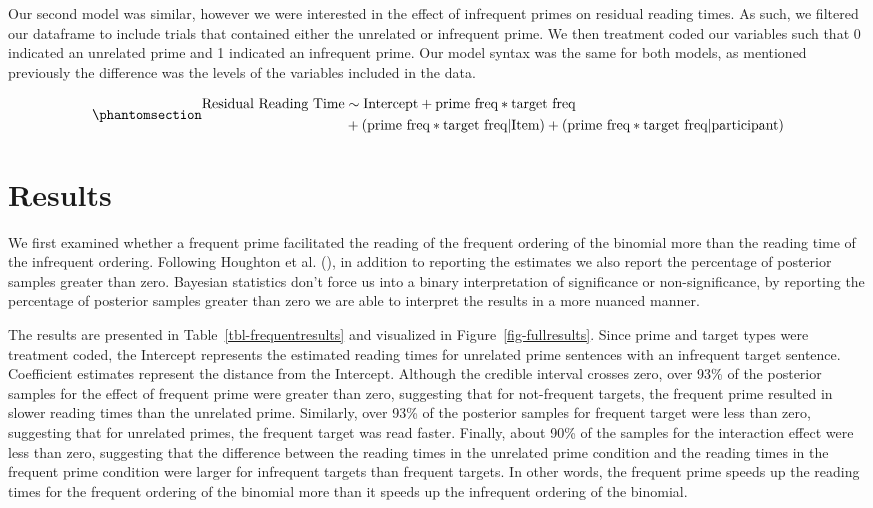 \documentclass[
  12pt,
]{scrartcl}
\begin{document}
Our second model was similar, however we were interested in the effect
of infrequent primes on residual reading times. As such, we filtered our
dataframe to include trials that contained either the unrelated or
infrequent prime. We then treatment coded our variables such that 0
indicated an unrelated prime and 1 indicated an infrequent prime. Our
model syntax was the same for both models, as mentioned previously the
difference was the levels of the variables included in the data.

\begin{equation}\phantomsection\label{eq-models}{
\begin{aligned}
\text{Residual Reading Time} & \sim \text{Intercept} + \text{prime freq} * \text{target freq} \\ 
&+ (\text{prime freq} * \text{target freq} | \text{Item}) + (\text{prime freq} * \text{target freq} | \text{participant})
\end{aligned}
}\end{equation}

\section{Results}\label{results}

We first examined whether a frequent prime facilitated the reading of
the frequent ordering of the binomial more than the reading time of the
infrequent ordering. Following Houghton et al.
(),
in addition to reporting the estimates we also report the percentage of
posterior samples greater than zero. Bayesian statistics don't force us
into a binary interpretation of significance or non-significance, by
reporting the percentage of posterior samples greater than zero we are
able to interpret the results in a more nuanced manner.

The results are presented in Table~\ref{tbl-frequentresults} and
visualized in Figure~\ref{fig-fullresults}. Since prime and target types
were treatment coded, the Intercept represents the estimated reading
times for unrelated prime sentences with an infrequent target sentence.
Coefficient estimates represent the distance from the Intercept.
Although the credible interval crosses zero, over 93\% of the posterior
samples for the effect of frequent prime were greater than zero,
suggesting that for not-frequent targets, the frequent prime resulted in
slower reading times than the unrelated prime. Similarly, over 93\% of
the posterior samples for frequent target were less than zero,
suggesting that for unrelated primes, the frequent target was read
faster. Finally, about 90\% of the samples for the interaction effect
were less than zero, suggesting that the difference between the reading
times in the unrelated prime condition and the reading times in the
frequent prime condition were larger for infrequent targets than
frequent targets. In other words, the frequent prime speeds up the
reading times for the frequent ordering of the binomial more than it
speeds up the infrequent ordering of the binomial.
\end{document}
